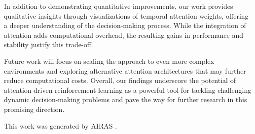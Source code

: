 \documentclass{article} %
\begin{document}
In addition to demonstrating quantitative improvements, our work provides qualitative insights through visualizations of temporal attention weights, offering a deeper understanding of the decision-making process. While the integration of attention adds computational overhead, the resulting gains in performance and stability justify this trade-off.

Future work will focus on scaling the approach to even more complex environments and exploring alternative attention architectures that may further reduce computational costs. Overall, our findings underscore the potential of attention-driven reinforcement learning as a powerful tool for tackling challenging dynamic decision-making problems and pave the way for further research in this promising direction.

This work was generated by \textsc{AIRAS} \citep{airas2025}.



\end{document}
